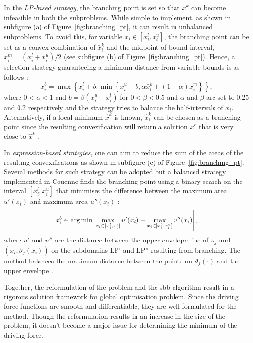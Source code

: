 \begin{enumerate}
\begin{enumerate}
		In the \emph{LP-based strategy}, the branching point is set so that $\bar{x}^k$ can become infeasible in both the subproblems. While simple to implement, as shown in subfigure (a) of Figure~\ref{fig:branching_pt}, it can result in unbalanced subproblems. To avoid this, for variable $x_i \in [x_i^l, x_i^u]$, the branching point can be set as a convex combination of $\bar{x}_i^k$ and the midpoint of bound interval, $x_i^m = (x_i^l + x_i^u) / 2$ (see subfigure (b) of Figure~\ref{fig:branching_pt}). Hence, a selection strategy guaranteeing a minimum distance from variable bounds is as follows \cite{Tawarmalani:2013aa}:
		\[
			x_i^b = \max \left \{x_i^l +b, \min \left \{x_i^u -b, \alpha \bar{x}_i^k + \left(1-\alpha\right)x_i^m \right \} \right \},
		\]
		where $0 < \alpha < 1$ and $b = \beta(x_i^u - x_i^l)$ for $0 < \beta < 0.5$ and $\alpha$ and $\beta$ are set to \num{0.25} and \num{0.2} respectively \cite{Belotti:2009aa} and  the strategy tries to balance the half-intervals of $x_i$. Alternatively, if a local minimum $\hat{x}^k$ is known, $\hat{x}_i^k$ can be chosen as a branching point since the resulting convexification will return a solution $\bar{x}^k$ that is very close to $\hat{x}^k$ \cite{Shectman:1998aa}.
		
	In \emph{expression-based strategies}, one can aim to reduce the sum of the areas of the resulting convexifications as shown in subfigure (c) of Figure~\ref{fig:branching_pt}. Several methods for such strategy can be adopted \cite{Kalantari:1987aa,Liu:1996aa} but a balanced strategy implemented in Couenne finds the branching point using a binary search on the interval $[x_i^l, x_i^u]$ that minimises the difference between the maximum area $u'(x_i)$ and maximum area $u''(x_i)$ \cite{Belotti:2009aa}:
	\[
		x_i^b \in \operatorname*{arg\,min} \left | \max_{x_i \in [x_i^l, x_i^b]} u'(x_i) - \max_{x_i \in [x_i^b, x_i^u]} u''(x_i) \right|,
	\]
	where $u'$ and $u''$ are the distance between the upper envelope line of $\vartheta_j$ and $(x_i, \vartheta_j(x_i))$ on the subdomains LP' and LP'' resulting from branching. The method balances the maximum distance between the points on $\vartheta_j(\cdot)$ and the upper envelope \cite{Belotti:2022aa}.
		\end{enumerate}	
\end{enumerate}

	  Together, the reformulation of the problem and the \gls{sbb} algorithm result in a rigorous solution framework for global optimisation problem. Since the driving force functions are smooth and differentiable, they are well formulated for the method. Though the reformulation results in an increase in the size of the problem, it doesn't become a major issue for determining the minimum of the driving force.
	  
